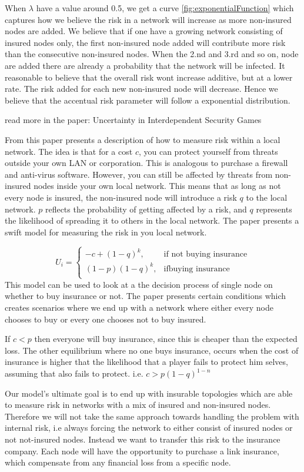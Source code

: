 When $\lambda$ have a value around 0.5, we get a curve \ref{fig:exponentialFunction} which captures how we believe the risk in a network will increase as more non-insured nodes are added. We believe that if one have a growing network consisting of insured nodes only, the first non-insured node added will contribute more risk than the consecutive non-insured nodes. When the 2.nd and 3.rd and so on, node are added there are already a probability that the network will be infected. It reasonable to believe that the overall risk wont increase additive, but at a lower rate. The risk added for each new non-insured node will decrease. Hence we believe that the accentual risk parameter will follow a exponential distribution. 

read more in the paper: Uncertainty in Interdependent Security Games

From this paper presents a description of how to measure risk within a local network. The idea is that for a cost $c$, you can protect yourself from threats outside your own LAN or corporation. This is analogous to purchase a firewall and anti-virus software. However, you can still be affected by threats from non-insured nodes inside your own local network. This means that as long as not every node is insured, the non-insured node will introduce a risk $q$ to the local network. $p$ reflects the probability of getting affected by a risk, and $q$ represents the likelihood of spreading it to others in the local network. The paper presents a swift model for measuring the risk in you local network.

\begin{equation}
    U_{i}= 
\begin{cases}
    -c + (1-q)^k ,& \text{if not buying insurance} \\
   (1-p)(1-q)^k,& \text{ifbuying insurance }  \\
    
    
\end{cases}
\label{eq:riskModel}
\end{equation}
 This model can be used to look at a the decision process of single node on whether to buy insurance or not. The paper presents certain conditions which creates scenarios where we end up with a network where either every node chooses to buy or every one chooses not to buy insured. 

If $c<p$ then everyone will buy insurance, since this is cheaper than the expected loss. The other equilibrium where no one buys insurance, occurs when the cost of insurance is higher that the likelihood that a player fails to protect him selves, assuming that also fails to protect. i.e. $c>p(1-q)^{1-n}$
 
Our model's ultimate goal is to end up with insurable topologies which are able to measure risk in networks with a mix of insured and non-insured nodes. Therefore we will not take the same approach towards handling the problem with internal risk, i.e always forcing the network to either consist of insured nodes or not not-insured nodes. Instead we want to transfer this risk to the insurance company. Each node will have the opportunity to purchase a link insurance, which compensate from any financial loss from a specific node. 